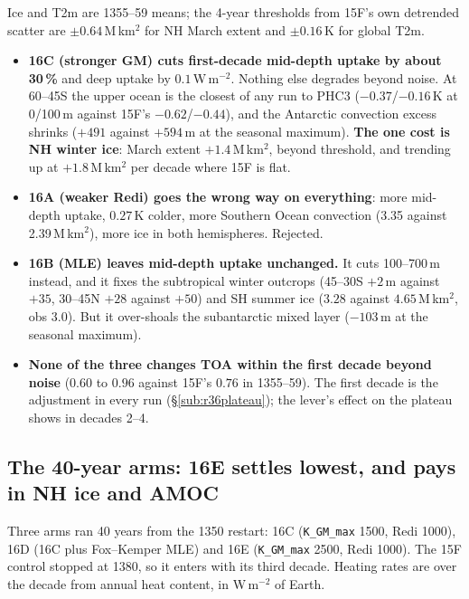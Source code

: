 \documentclass[10pt]{article}
\begin{document}
\noindent Ice and T2m are 1355--59 means; the 4-year thresholds from 15F's own detrended
scatter are $\pm0.64$\,M\,km$^2$ for NH March extent and $\pm0.16$\,K for global T2m.
\begin{itemize}\itemsep2pt
\item \textbf{16C (stronger GM) cuts first-decade mid-depth uptake by about 30\,\%} and deep
uptake by $0.1$\,W\,m$^{-2}$. Nothing else degrades beyond noise. At 60--45S the upper ocean
is the closest of any run to PHC3 ($-0.37$/$-0.16$\,K at 0/100\,m against 15F's
$-0.62$/$-0.44$), and the Antarctic convection excess shrinks ($+491$ against $+594$\,m at the
seasonal maximum). \textbf{The one cost is NH winter ice}: March extent $+1.4$\,M\,km$^2$,
beyond threshold, and trending up at $+1.8$\,M\,km$^2$ per decade where 15F is flat.
\item \textbf{16A (weaker Redi) goes the wrong way on everything}: more mid-depth uptake,
$0.27$\,K colder, more Southern Ocean convection (3.35 against 2.39\,M\,km$^2$), more ice in
both hemispheres. Rejected.
\item \textbf{16B (MLE) leaves mid-depth uptake unchanged.} It cuts 100--700\,m instead, and
it fixes the subtropical winter outcrops (45--30S $+2$\,m against $+35$, 30--45N $+28$
against $+50$) and SH summer ice ($3.28$ against $4.65$\,M\,km$^2$, obs $3.0$). But it
over-shoals the subantarctic mixed layer ($-103$\,m at the seasonal maximum).
\item \textbf{None of the three changes TOA within the first decade beyond noise} ($0.60$ to
$0.96$ against 15F's $0.76$ in 1355--59). The first decade is the adjustment in every run
(\S\ref{sub:r36plateau}); the lever's effect on the plateau shows in decades 2--4.
\end{itemize}

\subsection{The 40-year arms: 16E settles lowest, and pays in NH ice and AMOC}\label{sub:r36forty}

Three arms ran 40 years from the 1350 restart: 16C (\texttt{K\_GM\_max} 1500, Redi 1000), 16D
(16C plus Fox--Kemper MLE) and 16E (\texttt{K\_GM\_max} 2500, Redi 1000). The 15F control
stopped at 1380, so it enters with its third decade. Heating rates are over the decade from
annual heat content, in W\,m$^{-2}$ of Earth.
\end{document}
